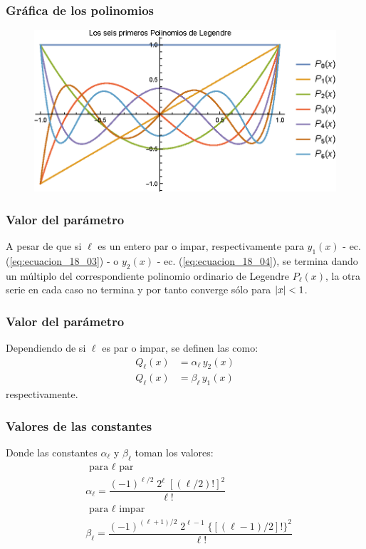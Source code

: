 \documentclass[12pt]{beamer}
\begin{document}
\begin{frame}
\frametitle{Gráfica de los polinomios}
\begin{figure}[H]
    \centering
    \includegraphics[scale=0.9]{Imagenes/Plot_Lagrange_0-6.eps}
\end{figure}
\end{frame}
\begin{frame}
\frametitle{Valor del parámetro}
A pesar de que si $\ell$ es un entero par o impar, respectivamente para $y_{1}(x)$ - ec. (\ref{eq:ecuacion_18_03}) - o $y_{2}(x)$ - ec. (\ref{eq:ecuacion_18_04}), \pause se termina dando un múltiplo del correspondiente polinomio ordinario de Legendre $P_{\ell}(x)$, \pause la otra serie en cada caso no termina y por tanto converge sólo para $\abs{x} < 1$.
\end{frame}
\begin{frame}
\frametitle{Valor del parámetro}
Dependiendo de si $\ell$ es par o impar, se definen las  como:
\pause
\begin{align*}
Q_{\ell} (x) &=  \alpha_{\ell} \, y_{2} (x) \\
Q_{\ell} (x) &=  \beta_{\ell} \, y_{1} (x)
\end{align*}
respectivamente.
\end{frame}
\begin{frame}
\frametitle{Valores de las constantes}
Donde las constantes $\alpha_{\ell}$ y $\beta_{\ell}$ toman los valores:
\pause
\begin{align}
&\mbox{ para $\ell$ par} \nonumber \\
&\alpha_{\ell} = \dfrac{(-1)^{\ell/2} \; 2^{\ell} \; [(\ell / 2)!]^{2}}{\ell!} \label{eq:ecuacion_18_05} \\[1em]
&\mbox{ para $\ell$ impar} \nonumber \\
&\beta_{\ell} = \dfrac{(-1)^{(\ell + 1)/2} \; 2^{\ell - 1} \; \lbrace \left[ (\ell - 1) /2 \right] ! \rbrace^{2}}{\ell!} \label{eq:ecuacion_18_06}
\end{align}
\end{frame}
\end{document}
